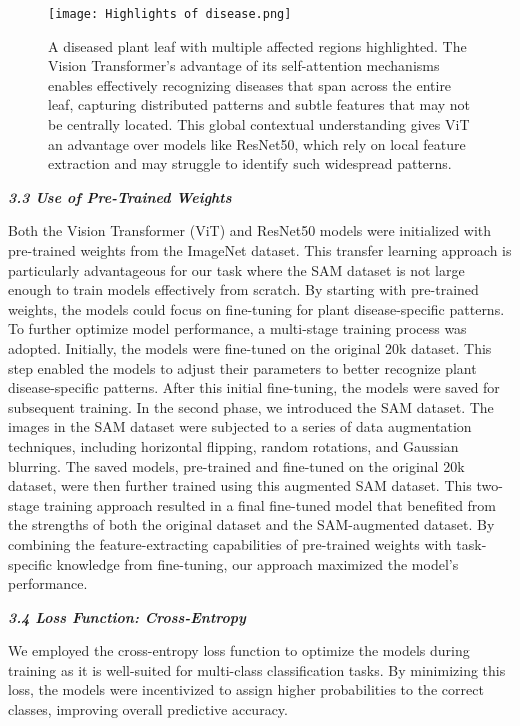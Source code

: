\documentclass{article}
\begin{document}
\begin{figure}[H]
\centering
\captionsetup{font=small}
\texttt{[image: Highlights of disease.png]} %
\caption{A diseased plant leaf with multiple affected regions highlighted. The Vision Transformer’s advantage of its self-attention mechanisms enables effectively recognizing diseases that span across the entire leaf, capturing distributed patterns and subtle features that may not be centrally located. This global contextual understanding gives ViT an advantage over models like ResNet50, which rely on local feature extraction and may struggle to identify such widespread patterns.}
\label{fig:leaf}
\end{figure}

\textbf{\textit{3.3 Use of Pre-Trained Weights}}

Both the Vision Transformer (ViT) and ResNet50 models were initialized with pre-trained weights from the ImageNet dataset. This transfer learning approach is particularly advantageous for our task where the SAM dataset is not large enough to train models effectively from scratch. By starting with pre-trained weights, the models could focus on fine-tuning for plant disease-specific patterns. To further optimize model performance, a multi-stage training process was adopted. Initially, the models were fine-tuned on the original 20k dataset. This step enabled the models to adjust their parameters to better recognize plant disease-specific patterns. After this initial fine-tuning, the models were saved for subsequent training. In the second phase, we introduced the SAM dataset. The images in the SAM dataset were subjected to a series of data augmentation techniques, including horizontal flipping, random rotations, and Gaussian blurring. The saved models, pre-trained and fine-tuned on the original 20k dataset, were then further trained using this augmented SAM dataset. This two-stage training approach resulted in a final fine-tuned model that benefited from the strengths of both the original dataset and the SAM-augmented dataset. By combining the feature-extracting capabilities of pre-trained weights with task-specific knowledge from fine-tuning, our approach maximized the model's performance.

\textbf{\textit{3.4 Loss Function: Cross-Entropy}}

We employed the cross-entropy loss function to optimize the models during training as it is well-suited for multi-class classification tasks. By minimizing this loss, the models were incentivized to assign higher probabilities to the correct classes, improving overall predictive accuracy. 
\end{document}
